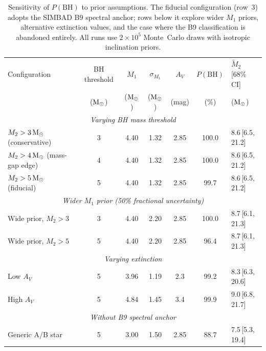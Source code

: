 \documentclass[usenatbib,fleqn]{mnras}
\newcommand{\Msun}{{\rm M}_\odot}
\begin{document}
\begin{table}
\centering
\caption{Sensitivity of $P(\text{BH})$ to prior assumptions.
The fiducial configuration (row~3) adopts the SIMBAD B9 spectral
anchor; rows below it explore wider $M_1$ priors, alternative
extinction values, and the case where the B9 classification is
abandoned entirely.  All runs use $2 \times 10^5$ Monte~Carlo
draws with isotropic inclination priors.}
\label{tab:sensitivity}
\begin{tabular}{lcccccl}
\toprule
Configuration & BH threshold & $M_1$ & $\sigma_{M_1}$ & $A_V$ &
$P(\text{BH})$ & $\tilde{M}_2$ [68\% CI] \\
 & ($\Msun$) & ($\Msun$) & ($\Msun$) & (mag) & (\%) & ($\Msun$) \\
\midrule
\multicolumn{7}{c}{\textit{Varying BH mass threshold}} \\
$M_2 > 3\,\Msun$ (conservative)  & 3 & 4.40 & 1.32 & 2.85 & 100.0 & 8.6\,[6.5,\,21.2] \\
$M_2 > 4\,\Msun$ (mass-gap edge) & 4 & 4.40 & 1.32 & 2.85 & 100.0 & 8.6\,[6.5,\,21.2] \\
$M_2 > 5\,\Msun$ (fiducial)      & 5 & 4.40 & 1.32 & 2.85 & 99.7  & 8.6\,[6.5,\,21.2] \\
\midrule
\multicolumn{7}{c}{\textit{Wider $M_1$ prior (50\% fractional uncertainty)}} \\
Wide prior, $M_2 > 3$            & 3 & 4.40 & 2.20 & 2.85 & 100.0 & 8.7\,[6.1,\,21.3] \\
Wide prior, $M_2 > 5$            & 5 & 4.40 & 2.20 & 2.85 & 96.4  & 8.7\,[6.1,\,21.3] \\
\midrule
\multicolumn{7}{c}{\textit{Varying extinction}} \\
Low $A_V$                        & 5 & 3.96 & 1.19 & 2.3  & 99.2  & 8.3\,[6.3,\,20.6] \\
High $A_V$                       & 5 & 4.84 & 1.45 & 3.4  & 99.9  & 9.0\,[6.8,\,21.7] \\
\midrule
\multicolumn{7}{c}{\textit{Without B9 spectral anchor}} \\
Generic A/B star                  & 5 & 3.00 & 1.50 & 2.85 & 88.7  & 7.5\,[5.3,\,19.4] \\
\bottomrule
\end{tabular}
\end{table}
\end{document}
